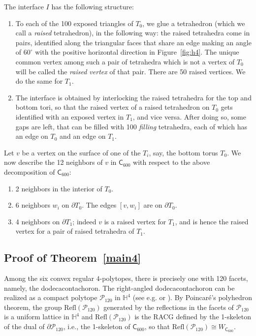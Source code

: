 \documentclass{amsart}
\theoremstyle{plain}
\theoremstyle{definition}
\theoremstyle{remark}
\numberwithin{equation}{section}
\newcommand{\hh}{\mathbb H}
\newcommand{\six}{\mathsf{C}_{600}}
\newcommand{\ttop}{T_{1}}
\newcommand{\tbtm}{T_{0}}
\newcommand{\interface}{I}
\begin{document}
The interface $\interface$ has the following structure:
\begin{enumerate}
    \item To each of the 100 exposed triangles of $\tbtm$, we glue a tetrahedron (which we call a \textit{raised} tetrahedron), in the following way: the raised tetrahedra come in pairs, identified along the triangular faces that share an edge making an angle of $60^\circ$ with the positive horizontal direction in Figure~\ref{fig:h4}. 
    The unique common vertex among such a pair of tetrahedra which is not a vertex of $\tbtm$ will be called the \textit{raised vertex} of that pair. There are 50 raised vertices.
    We do the same for $\ttop$.
    
    \item The interface is obtained by interlocking the raised tetrahedra for the top and bottom tori, so that the raised vertex of a raised tetrahedron on $\tbtm$ gets identified with an exposed vertex in $\ttop$, and vice versa. 
    After doing so, some gaps are left, that can be filled with  100 \textit{filling} tetrahedra, each of which has an edge on $\tbtm$ and an edge on $\ttop$.
\end{enumerate}
 

Let $v$ be a vertex on the surface of one of the $T_i$, say, the bottom torus $\tbtm$. 
We now describe the 12 neighbors of $v$ in $\six$ with respect to the above decomposition of $\six$:
\begin{enumerate}

\item 2 neighbors  in the interior of $\tbtm$. 

\item 6 neighbors $w_i$ on $\partial \tbtm$. 
The edges $[v,w_i]$ are on $\partial \tbtm$.

\item 4 neighbors  on $\partial \ttop$; indeed $v$ is a raised vertex for $\ttop$, and is hence the raised vertex for a pair of raised tetrahedra of $\ttop$.
\end{enumerate}
    


\subsection{Proof of Theorem~\ref{main4}}

 Among the six convex regular $4$-polytopes, there is precisely one with 120 facets, namely,
 the dodecacontachoron. The right-angled dodecacontachoron can be realized as a compact polytope $\mathcal{P}_{120}$ in $\hh^4$ (see e.g. \cite{Coxeter56,DA85} or \cite[Section~1.3]{martelli_at_rescue}).
 By Poincar\'e's polyhedron theorem, the group $\mathrm{Refl}(\mathcal{P}_{120})$ generated by the reflections in the facets of $\mathcal{P}_{120}$ is a uniform lattice in $\hh^4$ and $\mathrm{Refl}(\mathcal{P}_{120})$ is the RACG defined by the 1-skeleton of the dual of $\partial \mathcal{P}_{120}$, i.e., the 1-skeleton of $\six$, so that $\mathrm{Refl}(\mathcal{P}_{120})\cong W_{\six}$.
\end{document}
